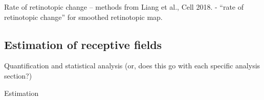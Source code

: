 Rate of retinotopic change -- methods from Liang et al., Cell 2018. - “rate of retinotopic change” for smoothed retinotopic map.

\subsection{Estimation of receptive fields}


Quantification and statistical analysis
(or, does this go with each specific analysis section?)

Estimation






